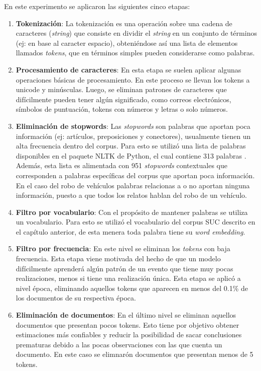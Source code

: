 En este experimento se aplicaron las siguientes cinco etapas:
\begin{enumerate}
  \item \textbf{Tokenización}: La tokenización es una operación sobre una cadena de caracteres (\textit{string}) que consiste en dividir el \textit{string} en un conjunto de términos (ej: en base al caracter espacio), obteniéndose así una lista de elementos llamados \textit{tokens}, que en términos simples pueden considerarse como palabras.
\item \textbf{Procesamiento de caracteres}: En esta etapa se suelen aplicar algunas operaciones básicas de procesamiento. En este proceso se llevan los tokens a unicode y minúsculas. Luego, se eliminan patrones de caracteres que difícilmente pueden tener algún significado, como correos electrónicos, símbolos de puntuación, tokens con números y letras o solo números. 
\item \textbf{Eliminación de stopwords}: Las \textit{stopwords} \citep{wilbur1992automatic} son palabras que aportan poca información (ej: artículos, preposiciones y conectores), usualmente tienen un alta frecuencia dentro del corpus. Para esto se utilizó una lista de palabras disponibles en el paquete NLTK de Python, el cual contiene 313 palabras \citep{bird2009natural}. Además, esta lista es alimentada con 951 \textit{stopwords} contextuales que corresponden a palabras específicas del corpus que aportan poca información. En el caso del robo de vehículos palabras relacionas a  o  no aportan ninguna información, puesto a que todos los relatos hablan del robo de un vehículo. 
\item \textbf{Filtro por vocabulario}: Con el propósito de mantener palabras  se utiliza un vocabulario. Para esto se utilizó el vocabulario del corpus SUC descrito en el capítulo anterior, de esta menera toda palabra tiene su \textit{word embedding}. 
\item \textbf{Filtro por frecuencia}: En este nivel se eliminan los \textit{tokens} con baja frecuencia. Esta etapa viene motivada del hecho de que un modelo difícilmente aprenderá algún patrón de un evento que tiene muy pocas realizaciones, menos si tiene una realización única. Esta etapa se aplicó a nivel época, eliminando aquellos tokens que aparecen en menos del 0.1\% de los documentos de su respectiva época.
\item \textbf{Eliminación de documentos}: En el último nivel se eliminan aquellos documentos que presentan pocos tokens. Esto tiene por objetivo obtener estimaciones más confiables y reducir la posibilidad de sacar conclusiones prematuras debido a las pocas observaciones con las que cuenta un documento. En este caso se elimnarón documentos que presentan menos de 5 tokens.
\end{enumerate}

